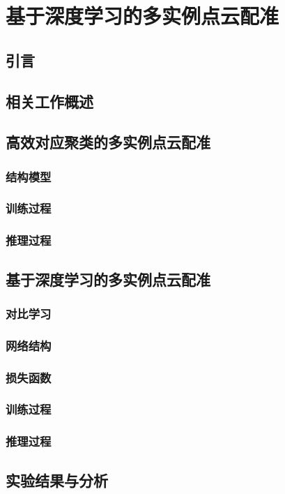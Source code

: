 \chapter{基于深度学习的多实例点云配准}
\section{引言}
\section{相关工作概述}
\section{高效对应聚类的多实例点云配准}
\subsection{结构模型}
\subsection{训练过程}
\subsection{推理过程}

\section{基于深度学习的多实例点云配准}
\subsection{对比学习}
\subsection{网络结构}
\subsection{损失函数}
\subsection{训练过程}
\subsection{推理过程}

\section{实验结果与分析}
